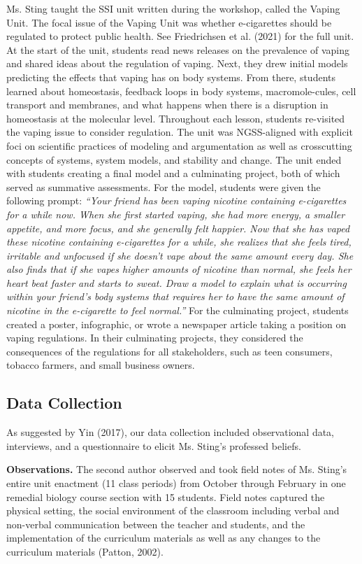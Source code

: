\documentclass[11.5pt]{sig-alternate}
\begin{document}
\begin{large}
Ms. Sting taught the SSI unit written during the workshop, called the Vaping Unit. The focal issue of the Vaping Unit was whether e-cigarettes should be regulated to protect public health. See Friedrichsen et al. (2021) for the full unit. At the start of the unit, students read news releases on the prevalence of vaping and shared ideas about the regulation of vaping. Next, they drew initial models predicting the effects that vaping has on body systems. From there, students learned about homeostasis, feedback loops in body systems, macromole-cules, cell transport and membranes, and what happens when there is a disruption in homeostasis at the molecular level. Throughout each lesson, students re-visited the vaping issue to consider regulation. The unit was NGSS-aligned with explicit foci on scientific practices of modeling and argumentation as well as crosscutting concepts of systems, system models, and stability and change. The unit ended with students creating a final model and a culminating project, both of which served as summative assessments. For the model, students were given the following prompt: \textit{“Your friend has been vaping nicotine containing e-cigarettes for a while now. When she first started vaping, she had more energy, a smaller appetite, and more focus, and she generally felt happier. Now that she has vaped these nicotine containing e-cigarettes for a while, she realizes that she feels tired, irritable and unfocused if she doesn’t vape about the same amount every day. She also finds that if she vapes higher amounts of nicotine than normal, she feels her heart beat faster and starts to sweat. Draw a model to explain what is occurring within your friend’s body systems that requires her to have the same amount of nicotine in the e-cigarette to feel normal.”} For the culminating project, students created a poster, infographic, or wrote a newspaper article taking a position on vaping regulations. In their culminating projects, they considered the consequences of the regulations for all stakeholders, such as teen consumers, tobacco farmers, and small business owners.

\subsection*{Data Collection}

As suggested by Yin (2017), our data collection included observational data, interviews, and a questionnaire to elicit Ms. Sting’s professed beliefs.

\textbf{Observations.} The second author observed and took field notes of Ms. Sting’s entire unit enactment (11 class periods) from October through February in one remedial biology course section with 15 students. Field notes captured the physical setting, the social environment of the classroom including verbal and non-verbal communication between the teacher and students, and the implementation of the curriculum materials as well as any changes to the curriculum materials (Patton, 2002).


\end{large}
\end{document}
